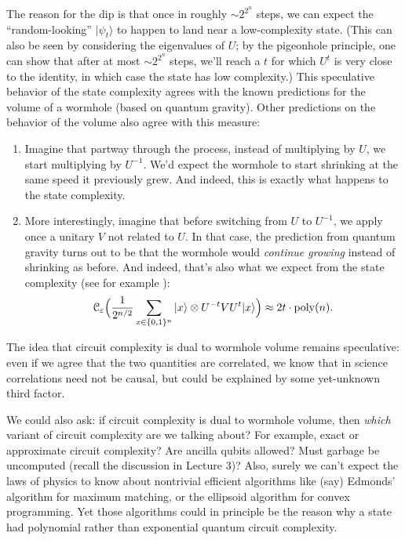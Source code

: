\documentclass[12pt]{report}
\theoremstyle{plain}
\theoremstyle{definition}
\newcommand{\poly}{\operatorname{poly}}
\newcommand{\eps}{\varepsilon}
\renewcommand{\ket}[1]{|#1\rangle}
\begin{document}
The reason for the dip is that once in roughly $\sim 2^{2^n}$ steps, we can expect the ``random-looking'' $\ket{\psi_t}$ to happen to land near a low-complexity state.  (This can also be seen by considering the eigenvalues of $U$; by the pigeonhole principle, one can show that after at most $\sim 2^{2^n}$ steps, we'll reach a $t$ for which $U^t$ is very close to the identity, in which case the state has low complexity.)  This speculative behavior of the state complexity agrees with the known predictions for the volume of a wormhole (based on quantum gravity). Other predictions on the behavior of the volume also agree with this measure:
\begin{enumerate}
    \item Imagine that partway through the process, instead of multiplying by $U$, we start multiplying by $U^{-1}$. We'd expect the wormhole to start shrinking at the same speed it previously grew. And indeed, this is exactly what happens to the state complexity.
    \item More interestingly, imagine that before switching from $U$ to $U^{-1}$, we apply once a unitary $V$ not related to $U$. In that case, the prediction from quantum gravity turns out to be that the wormhole would \emph{continue growing} instead of shrinking as before. And indeed, that's also what we expect from the state complexity (see for example \cite{SS14}):
\[
{\cal C}_\eps\Big(\frac{1}{2^{n/2}} \sum_{x \in \{0,1\}^n} \ket{x} \otimes U^{-t} V U^t \ket{x} \Big) \approx 2t \cdot \poly(n).
\]
\end{enumerate}

The idea that circuit complexity is dual to wormhole volume remains speculative: even if we agree that the two quantities are correlated, we know that in science correlations need not be causal, but could be explained by some yet-unknown third factor.

We could also ask: if circuit complexity is dual to wormhole volume, then {\em which} variant of circuit complexity are we talking about?  For example, exact or approximate circuit complexity?  Are ancilla qubits allowed?  Must garbage be uncomputed (recall the discussion in Lecture 3)?  Also, surely we can't expect the laws of physics to know about nontrivial efficient algorithms like (say) Edmonds' algorithm for maximum matching, or the ellipsoid algorithm for convex programming.  Yet those algorithms could in principle be the reason why a state had polynomial rather than exponential quantum circuit complexity.
\end{document}
